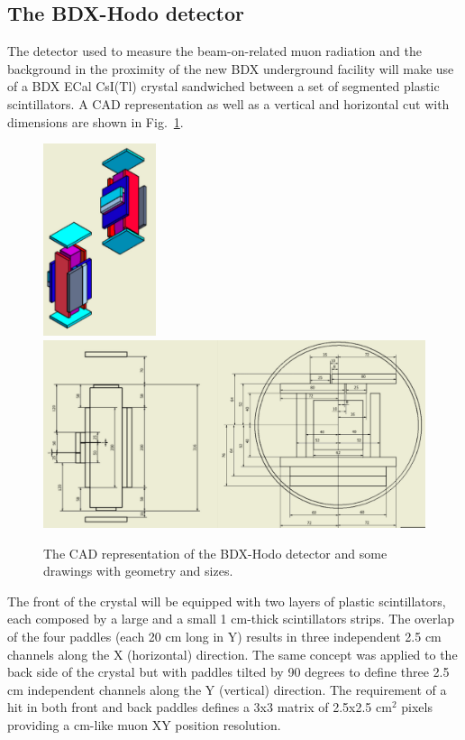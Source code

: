 \subsection{The BDX-Hodo detector \label{sec:BDX-hodo}}
The detector used to measure the beam-on-related muon radiation and the background in the proximity of the new BDX underground facility will  make use of a BDX ECal CsI(Tl) crystal sandwiched between a set of segmented plastic scintillators.
A CAD representation as well as  a vertical and horizontal  cut with dimensions are shown in Fig.~\ref{fig:det-cad}.
\begin{figure}[h!] 
\center
\includegraphics[width=3.3cm]{figs/det-3d1.pdf}  
\includegraphics[width=11.5cm]{figs/det-3d2.pdf}   
\caption{The CAD representation of the BDX-Hodo detector and some drawings with geometry and sizes.}
\label{fig:det-cad}
\end{figure}
The front of the crystal will be equipped with two  layers of plastic scintillators, each composed by  a large and a small 1 cm-thick scintillators strips. The overlap of the four paddles (each 20 cm long in Y)  results in three independent  2.5 cm channels along the X (horizontal) direction.
The same concept was applied to the  back side of the crystal but with paddles tilted by 90 degrees to define three 2.5 cm independent channels along the Y (vertical) direction. The requirement of a hit in both front and back paddles defines a 3x3 matrix of 2.5x2.5 cm$^2$ pixels providing a cm-like muon XY position resolution. 
